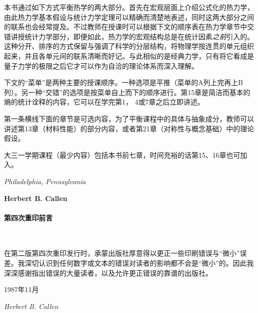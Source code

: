 本书通过如下方式平衡热学的两大部分。首先在宏观层面上介绍公式化的热力学，由此热力学基本假设与统计力学定理可以精确而清楚地表述，同时这两大部分之间的联系也会经常提及。不过教师在授课时可以根据下文的顺序表在热力学章节中交错讲授统计力学部分，即便如此，热力学的宏观结构总是在统计因素{\it 之前}引入的。这种分开、排序的方式保留与强调了科学的分层结构，将物理学按连贯的单元组织起来，并且各单元间的联系清晰而好记。与此相似的是经典力学，只有将它看成是量子力学的极限之后它才可以作为自洽的理论体系而深入理解。

下文的“菜单”是两种主要的授课顺序。一种选项是平推（菜单的A列上完再上B列）。另一种“交错”的选项是按菜单自上而下的顺序进行。第15章是简洁而基本的熵的统计诠释的内容，它可以在学完第1， 4或7章之后立即讲述。

第一条横线下面的章节是可选内容，为了平衡课程中的具体与抽象成分，教师可以讲述第13章（材料性能）的部分内容，或者第21章（对称性与概念基础）中的理论假设。

大三一学期课程（最少内容）包括本书前七章，时间充裕的话第15、16章也可加入。

\begin{flushright}
{\it Philadelphia, Pennsylvania} 

{\bf Herbert B. Callen}
\end{flushright}


\paragraph{第四次重印前言}
\ 

在第二版第四次重印发行时，承蒙出版社厚意得以更正一些印刷错误与“微小”误差。我深切认识到任何数字或文本的错误对读者的影响都不会是“微小”的。因此我深深感谢指出错误的大量读者，以及允许更正错误的靠谱的出版社。

\begin{flushright}
1987年11月

{\it Herbert B. Callen}
\end{flushright}



